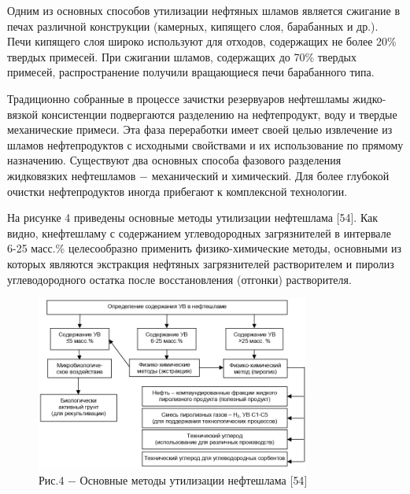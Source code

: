 \begin{multicols}{2}
Одним из основных способов утилизации нефтяных шламов является сжигание
в печах различной конструкции (камерных, кипящего слоя, барабанных и
др.). Печи кипящего слоя широко используют для отходов, содержащих не
более 20\% твердых примесей. При сжигании шламов, содержащих до 70\%
твердых примесей, распространение получили вращающиеся печи барабанного
типа.

Традиционно собранные в процессе зачистки резервуаров нефтешламы
жидко-вязкой консистенции подвергаются разделению на нефтепродукт, воду
и твердые механические примеси. Эта фаза переработки имеет своей целью
извлечение из шламов нефтепродуктов с исходными свойствами и их
использование по прямому назначению. Существуют два основных способа
фазового разделения жидковязких нефтешламов − механический и химический.
Для более глубокой очистки нефтепродуктов иногда прибегают к комплексной
технологии.

На рисунке 4 приведены основные методы утилизации нефтешлама {[}54{]}.
Как видно, кнефтешламу с содержанием углеводородных загрязнителей в
интервале 6-25 масс.\% целесообразно применить физико-химические методы,
основными из которых являются экстракция нефтяных загрязнителей
растворителем и пиролиз углеводородного остатка после восстановления
(отгонки) растворителя.
\end{multicols}

\begin{figure}[H]
	\centering
	\includegraphics[width=0.8\textwidth]{media/chem2/image67}
	\caption*{Рис.4 − Основные методы утилизации нефтешлама {[}54{]}}
\end{figure}

